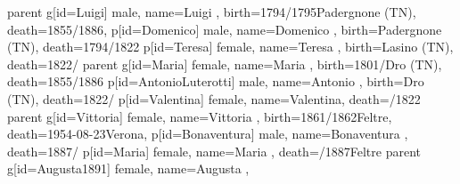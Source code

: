 \documentclass{article}
\begin{document}
\begin{midpage}
\begin{center}
\begin{genealogypicture}
{{{{{{{                        }
                        parent{
                            g[id=Luigi]{
                                male,
                                name={Luigi },
                                birth={1794/1795}{Padergnone (TN)},
                                death={1855/1886}{},
                            }
                            p[id=Domenico]{
                                male,
                                name={Domenico },
                                birth={Padergnone (TN)}{},
                                death={1794/1822}{}
                            }
                            p[id=Teresa]{
                                female,
                                name={Teresa },
                                birth={Lasino (TN)}{},
                                death={1822/}{}
                            }
                        }
                        parent{
                            g[id=Maria]{
                                female,
                                name={Maria },
                                birth={1801/}{Dro (TN)},
                                death={1855/1886}{}
                            }
                            p[id=AntonioLuterotti]{
                                male,
                                name={Antonio },
                                birth={Dro (TN)}{},
                                death={1822/}{}
                            }
                            p[id=Valentina]{
                                female,
                                name={Valentina},
                                death={/1822}{}
                            }
                        }
                    }
                }
                parent{
                    g[id=Vittoria]{
                        female,
                        name={Vittoria },
                        birth={1861/1862}{Feltre},
                        death={1954-08-23}{Verona},
                    }
                    p[id=Bonaventura]{
                        male,
                        name={Bonaventura },
                        death={1887/}{}
                    }
                    p[id=Maria]{
                        female,
                        name={Maria },
                        death={/1887}{Feltre}
                    }
                }
            }
            parent{
                g[id=Augusta1891]{
                    female,
                    name={Augusta },
}}}}}
\end{genealogypicture}
\end{center}
\end{midpage}
\end{document}
